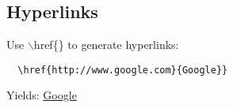 
\subsection{Hyperlinks}
Use $\backslash$href\{\} to generate hyperlinks:

\begin{verbatim}
  \href{http://www.google.com}{Google}}
\end{verbatim}

\noindent Yields: \href{http://www.google.com}{Google}

